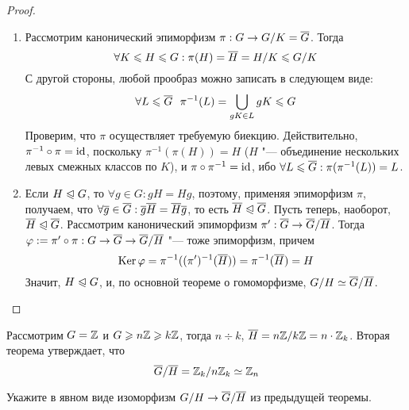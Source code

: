 \begin{proof}~
	\begin{enumerate}
		\item Рассмотрим канонический эпиморфизм $\pi: G \to G / K = \overline{G}$. Тогда
		\[
			\forall K \leqslant H \leqslant G: \pi(H) =\overline{H} = H / K \leqslant G / K
		\]
		С другой стороны, любой прообраз можно записать в следующем виде:
		\[
			\forall L \le \ol{G}\ \ \pi^{-1}(L) = \bigcup_{gK \in L}gK \hm\le G
		\]
		Проверим, что $\pi$ осуществляет требуемую биекцию. Действительно, $\pi^{-1}\circ\pi \hm= \id$, поскольку $\pi^{-1}(\pi(H)) = H$ ($H$ "--- объединение нескольких левых смежных классов по $K$), и $\pi\circ\pi^{-1} = \operatorname{id}$, ибо $\forall L \leqslant \overline{G}: \pi(\pi^{-1}(L)) = L$.
		
		\item Если $H \trianglelefteqslant G$, то $\forall g \in G: gH = Hg$, поэтому, применяя эпиморфизм $\pi$, получаем, что $\forall \overline{g} \in \overline{G}: \overline{g}\overline{H} = \overline{H}\overline{g}$, то есть $\overline{H} \trianglelefteqslant \overline{G}$. Пусть теперь, наоборот, $\overline{H} \trianglelefteqslant \overline{G}$. Рассмотрим канонический эпиморфизм $\pi': \overline{G} \to \overline{G} / \overline{H}$. Тогда $\phi := \pi'\circ\pi: G \hm\to \ol{G} \hm\to \ol{G} / \ol{H}$ "--- тоже эпиморфизм, причем
		\[
			\operatorname{Ker} \varphi = \pi^{-1}((\pi')^{-1}(\overline{H})) = \pi^{-1}(\overline{H}) = H
		\]
		Значит, $H \trianglelefteqslant G$, и, по основной теореме о гомоморфизме, $G / H \simeq \overline{G} / \overline{H}$.
	\end{enumerate}
\end{proof}

\begin{example}
	Рассмотрим $G = \mathbb{Z}$ и $G \geqslant n\mathbb{Z} \geqslant k\mathbb{Z}$, тогда $n \div k$, $\overline{H} = n\mathbb{Z} / k\mathbb{Z} = n \cdot \mathbb{Z}_k$. Вторая теорема утверждает, что
	\[
		\overline{G} / \overline{H} = \mathbb{Z}_k / n\mathbb{Z}_k \simeq \mathbb{Z}_n
	\]
\end{example}

\begin{exercise}
	Укажите в явном виде изоморфизм $G / H \hm\to \ol{G} / \ol{H}$ из предыдущей теоремы.
\end{exercise}